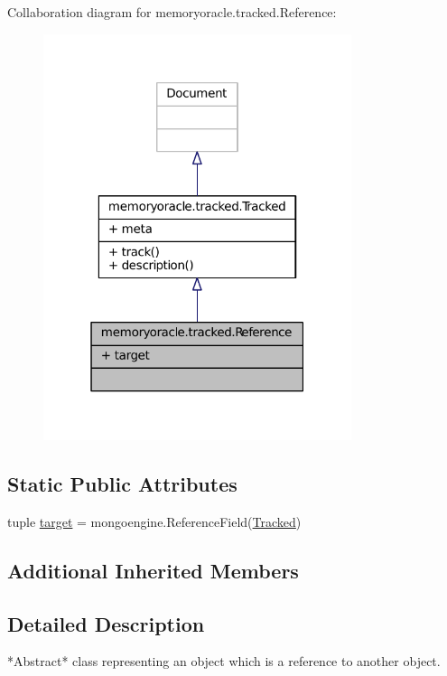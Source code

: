 Collaboration diagram for memoryoracle.\+tracked.\+Reference\+:
\nopagebreak
\begin{figure}[H]
\begin{center}
\leavevmode
\includegraphics[width=256pt]{classmemoryoracle_1_1tracked_1_1Reference__coll__graph}
\end{center}
\end{figure}
\subsection*{Static Public Attributes}
\begin{DoxyCompactItemize}
\item 
tuple \hyperlink{classmemoryoracle_1_1tracked_1_1Reference_aa3bb76fd8a4e9a211125c1f04fc61983}{target} = mongoengine.\+Reference\+Field(\hyperlink{classmemoryoracle_1_1tracked_1_1Tracked}{Tracked})
\end{DoxyCompactItemize}
\subsection*{Additional Inherited Members}


\subsection{Detailed Description}
\begin{DoxyVerb}*Abstract* class representing an object which is a reference to another
object.
\end{DoxyVerb}
 


